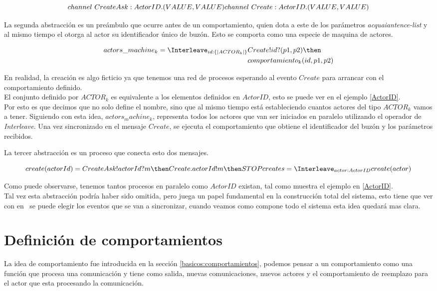 \[
channel\ CreateAsk:ActorID.(VALUE, VALUE)\\
channel\ Create:ActorID.(VALUE, VALUE)
\]

La segunda abstracción es un preámbulo que ocurre antes de un comportamiento, quien dota a este de 
los parámetros \textit{acquaiantence-list} y al mismo tiempo el otorga al actor su identificador 
único de buzón. Esto se comporta como una especie de maquina de actores.

\begin{align}
actors\_machine_k = \Interleave_{ id : \{| ACTOR_k |\} } & Create!id?(p1, p2) \then \\
&comportamiento_k(id, p1, p2)
\end{align}

En realidad, la creación es algo ficticio ya que tenemos una red de procesos \CSP esperando al 
evento $Create$ para arrancar con el comportamiento definido. \\
El conjunto definido por $ACTOR_k$ es equivalente a los elementos definidos  en $ActorID$, 
esto se puede ver en el ejemplo \ref{ActorID}. \\
Por esto es que decimos que no solo define el nombre, sino que al mismo tiempo está
estableciendo cuantos actores del tipo $ACTOR_k$ vamos a tener.
Siguiendo con esta idea, $actors_machine_k$, representa todos los actores 
que van ser iniciados en paralelo utilizando el operador de \textit{Interleave}.
Una vez sincronizado en el mensaje $Create$, se ejecuta el comportamiento que obtiene
el identificador del buzón y los parámetros recibidos.

La tercer abstracción es un proceso que conecta esto dos mensajes. 
 
\[
create(actorId) = CreateAsk!actorId?m \then Create.actorId!m \then STOP \\
creates = \Interleave_{actor : ActorID} create(actor)
\]

Como puede observarse, tenemos tantos procesos en paralelo como $ActorID$ existan, 
tal como muestra el ejemplo en \ref{ActorID}. \\
Tal vez esta abstracción podría haber sido omitida, pero juega un papel fundamental
en la construcción total del sistema, esto tiene que ver con en \CSP\ se puede elegir los 
eventos \cite[chap.~2,p.~55]{Roscoe:1997:TPC:550448} que se van a sincronizar, cuando 
veamos como compone todo el sistema esta idea quedará mas clara.


\section{Definición de comportamientos}
La idea de comportamiento fue introducida en la sección \ref{basicos:comportamientos}, 
podemos pensar a un comportamiento como una función que procesa una comunicación y tiene como salida,
nuevas comunicaciones, nuevos actores y el comportamiento de reemplazo para el
actor que esta procesando la comunicación.

